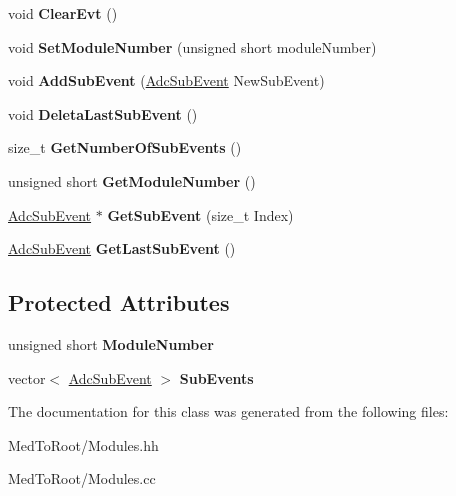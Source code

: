 \begin{DoxyCompactItemize}
\item 
\hypertarget{class_adc_module_a04ea54bf49f99a47d9b16011cf0d5efd}{void {\bfseries Clear\-Evt} ()}\label{class_adc_module_a04ea54bf49f99a47d9b16011cf0d5efd}

\item 
\hypertarget{class_adc_module_a6debf2b84685eef14f16be21baa6adab}{void {\bfseries Set\-Module\-Number} (unsigned short module\-Number)}\label{class_adc_module_a6debf2b84685eef14f16be21baa6adab}

\item 
\hypertarget{class_adc_module_a3a156c91cd5ba2e1195d9bc31a88bd92}{void {\bfseries Add\-Sub\-Event} (\hyperlink{class_adc_sub_event}{Adc\-Sub\-Event} New\-Sub\-Event)}\label{class_adc_module_a3a156c91cd5ba2e1195d9bc31a88bd92}

\item 
\hypertarget{class_adc_module_ae8b246298ada5eb002cfefc383810ddc}{void {\bfseries Deleta\-Last\-Sub\-Event} ()}\label{class_adc_module_ae8b246298ada5eb002cfefc383810ddc}

\item 
\hypertarget{class_adc_module_ae58f16947fe1a686aba589be53cfadf5}{size\-\_\-t {\bfseries Get\-Number\-Of\-Sub\-Events} ()}\label{class_adc_module_ae58f16947fe1a686aba589be53cfadf5}

\item 
\hypertarget{class_adc_module_aeffd018af28812f62907bbd7e0e4bccc}{unsigned short {\bfseries Get\-Module\-Number} ()}\label{class_adc_module_aeffd018af28812f62907bbd7e0e4bccc}

\item 
\hypertarget{class_adc_module_a2a5274842c08316c6cb694ecbbd502c6}{\hyperlink{class_adc_sub_event}{Adc\-Sub\-Event} $\ast$ {\bfseries Get\-Sub\-Event} (size\-\_\-t Index)}\label{class_adc_module_a2a5274842c08316c6cb694ecbbd502c6}

\item 
\hypertarget{class_adc_module_a34e67e298e392a934a97c3ebad4b30e4}{\hyperlink{class_adc_sub_event}{Adc\-Sub\-Event} {\bfseries Get\-Last\-Sub\-Event} ()}\label{class_adc_module_a34e67e298e392a934a97c3ebad4b30e4}

\end{DoxyCompactItemize}
\subsection*{Protected Attributes}
\begin{DoxyCompactItemize}
\item 
\hypertarget{class_adc_module_a43a09a684ccb5fc37747241697f269ee}{unsigned short {\bfseries Module\-Number}}\label{class_adc_module_a43a09a684ccb5fc37747241697f269ee}

\item 
\hypertarget{class_adc_module_adb2c7c6afe959590bf3ab8df284b4518}{vector$<$ \hyperlink{class_adc_sub_event}{Adc\-Sub\-Event} $>$ {\bfseries Sub\-Events}}\label{class_adc_module_adb2c7c6afe959590bf3ab8df284b4518}

\end{DoxyCompactItemize}


The documentation for this class was generated from the following files\-:\begin{DoxyCompactItemize}
\item 
Med\-To\-Root/Modules.\-hh\item 
Med\-To\-Root/Modules.\-cc\end{DoxyCompactItemize}

